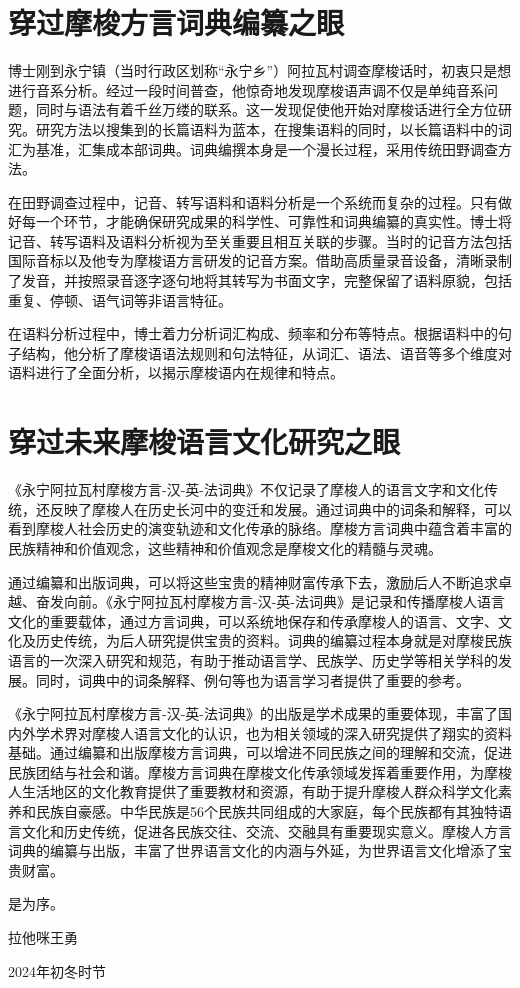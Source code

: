 \section*{穿过摩梭方言词典编纂之眼}

博士刚到永宁镇（当时行政区划称“永宁乡”）阿拉瓦村调查摩梭话时，初衷只是想进行音系分析。经过一段时间普查，他惊奇地发现摩梭语声调不仅是单纯音系问题，同时与语法有着千丝万缕的联系。这一发现促使他开始对摩梭话进行全方位研究。研究方法以搜集到的长篇语料为蓝本，在搜集语料的同时，以长篇语料中的词汇为基准，汇集成本部词典。词典编撰本身是一个漫长过程，采用传统田野调查方法。

在田野调查过程中，记音、转写语料和语料分析是一个系统而复杂的过程。只有做好每一个环节，才能确保研究成果的科学性、可靠性和词典编纂的真实性。博士将记音、转写语料及语料分析视为至关重要且相互关联的步骤。当时的记音方法包括国际音标以及他专为摩梭语方言研发的记音方案。借助高质量录音设备，清晰录制了发音，并按照录音逐字逐句地将其转写为书面文字，完整保留了语料原貌，包括重复、停顿、语气词等非语言特征。

在语料分析过程中，博士着力分析词汇构成、频率和分布等特点。根据语料中的句子结构，他分析了摩梭语语法规则和句法特征，从词汇、语法、语音等多个维度对语料进行了全面分析，以揭示摩梭语内在规律和特点。

\section*{穿过未来摩梭语言文化研究之眼}

《永宁阿拉瓦村摩梭方言-汉-英-法词典》不仅记录了摩梭人的语言文字和文化传统，还反映了摩梭人在历史长河中的变迁和发展。通过词典中的词条和解释，可以看到摩梭人社会历史的演变轨迹和文化传承的脉络。摩梭方言词典中蕴含着丰富的民族精神和价值观念，这些精神和价值观念是摩梭文化的精髓与灵魂。

通过编纂和出版词典，可以将这些宝贵的精神财富传承下去，激励后人不断追求卓越、奋发向前。《永宁阿拉瓦村摩梭方言-汉-英-法词典》是记录和传播摩梭人语言文化的重要载体，通过方言词典，可以系统地保存和传承摩梭人的语言、文字、文化及历史传统，为后人研究提供宝贵的资料。词典的编纂过程本身就是对摩梭民族语言的一次深入研究和规范，有助于推动语言学、民族学、历史学等相关学科的发展。同时，词典中的词条解释、例句等也为语言学习者提供了重要的参考。

《永宁阿拉瓦村摩梭方言-汉-英-法词典》的出版是学术成果的重要体现，丰富了国内外学术界对摩梭人语言文化的认识，也为相关领域的深入研究提供了翔实的资料基础。通过编纂和出版摩梭方言词典，可以增进不同民族之间的理解和交流，促进民族团结与社会和谐。摩梭方言词典在摩梭文化传承领域发挥着重要作用，为摩梭人生活地区的文化教育提供了重要教材和资源，有助于提升摩梭人群众科学文化素养和民族自豪感。中华民族是56个民族共同组成的大家庭，每个民族都有其独特语言文化和历史传统，促进各民族交往、交流、交融具有重要现实意义。摩梭人方言词典的编纂与出版，丰富了世界语言文化的内涵与外延，为世界语言文化增添了宝贵财富。

是为序。

{\raggedleft 拉他咪王勇\par}

{\raggedleft 2024年初冬时节\par}
